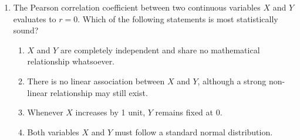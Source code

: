 \documentclass[11pt,a4paper]{article}
\begin{document}
\begin{enumerate}[leftmargin=*,itemsep=2pt]
\item The Pearson correlation coefficient between two continuous variables $X$ and $Y$ evaluates to $r = 0$. Which of the following statements is most statistically sound?
\begin{enumerate}[label=\Alph*.]
  \item $X$ and $Y$ are completely independent and share no mathematical relationship whatsoever.
  \item There is no linear association between $X$ and $Y$, although a strong non-linear relationship may still exist.
  \item Whenever $X$ increases by 1 unit, $Y$ remains fixed at 0.
  \item Both variables $X$ and $Y$ must follow a standard normal distribution.
\end{enumerate}

\end{enumerate}
\end{document}

